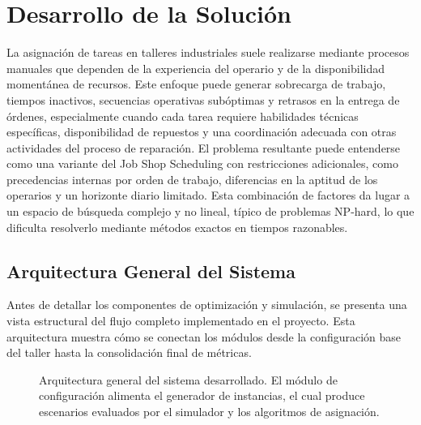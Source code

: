 \chapter{Desarrollo de la Solución}

La asignación de tareas en talleres industriales suele realizarse mediante procesos 
manuales que dependen de la experiencia del operario y de la disponibilidad momentánea 
de recursos. Este enfoque puede generar sobrecarga de trabajo, tiempos inactivos, secuencias 
operativas subóptimas y retrasos en la entrega de órdenes, especialmente cuando cada tarea 
requiere habilidades técnicas específicas, disponibilidad de repuestos y una coordinación 
adecuada con otras actividades del proceso de reparación. El problema resultante puede 
entenderse como una variante del Job Shop Scheduling con restricciones adicionales, como 
precedencias internas por orden de trabajo, diferencias en la aptitud de los operarios y 
un horizonte diario limitado. Esta combinación de factores da lugar a un espacio de búsqueda 
complejo y no lineal, típico de problemas NP-hard, lo que dificulta resolverlo mediante 
métodos exactos en tiempos razonables.

\section{Arquitectura General del Sistema}

Antes de detallar los componentes de optimización y simulación, se presenta una vista estructural
del flujo completo implementado en el proyecto. Esta arquitectura muestra cómo se conectan los
módulos desde la configuración base del taller hasta la consolidación final de métricas.

\begin{figure}[H]
\centering
\shorthandoff{>}
\shorthandon{>}
\caption{Arquitectura general del sistema desarrollado. El módulo de configuración alimenta el generador de instancias, el cual produce escenarios evaluados por el simulador y los algoritmos de asignación.}
\label{fig:arquitectura}
\end{figure}


